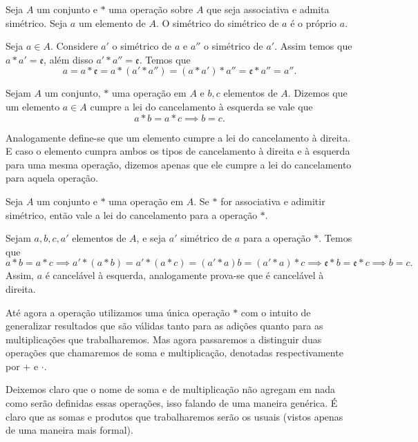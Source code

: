 \documentclass[../main.tex]{subfiles}
\begin{document}
\begin{prop}\label{agb-prop-simetricoSimetrico}
    Seja $A$ um conjunto e $*$ uma operação sobre $A$ que seja associativa e admita simétrico. Seja $a$ um elemento de $A$. O simétrico do simétrico de $a$ é o próprio $a$. 
\end{prop}
\begin{dem}
    Seja $a \in A$. Considere $a'$ o simétrico de $a$ e $a''$ o simétrico de $a'$. Assim temos que $a * a' = \mathfrak{e}$, além disso $a' * a'' = \mathfrak{e}$.
    Temos que 
    \[ a = a * \mathfrak{e} = a * (a' * a'') = (a * a') * a'' = \mathfrak{e} * a'' = a''. \]
\end{dem}
\begin{defi}
    Sejam $A$ um conjunto, $*$ uma operação em $A$ e $b,c$ elementos de $A$. Dizemos que um elemento $a \in A$ cumpre a lei do cancelamento à esquerda se vale que \[ a*b=a*c \implies b=c. \]
\end{defi}
    Analogamente define-se que um elemento cumpre a lei do cancelamento à direita. E caso o elemento cumpra ambos os tipos de cancelamento à direita e à esquerda para uma mesma operação, dizemos apenas que ele cumpre a lei do cancelamento para aquela operação.
\begin{prop}\label{agb-prop-leiCancelamento}
    Seja $A$ um conjunto e $*$ uma operação em $A$. Se $*$ for associativa e adimitir simétrico, então vale a lei do cancelamento para a operação $*$.
\end{prop}
\begin{dem}
    Sejam $a,b,c,a'$ elementos de $A$, e seja $a'$ simétrico de $a$ para a operação $*$. Temos que 
    \[a*b = a*c \implies a' * (a * b) = a' *(a*c) = (a' * a ) b = (a'*a)*c \implies \mathfrak{e} * b = \mathfrak{e} * c \implies b = c. \] 
    Assim, $a$ é cancelável à esquerda, analogamente prova-se que é cancelável à direita.
\end{dem}

Até agora a operação utilizamos uma única operação $*$ com o intuito de generalizar resultados que são válidas tanto para as adições quanto para as multiplicações que trabalharemos. Mas agora passaremos a distinguir duas operações que chamaremos de soma e multiplicação, denotadas respectivamente por $+$ e $\cdot$.

Deixemos claro que o nome de soma e de multiplicação não agregam em nada como serão definidas essas operações, isso falando de uma maneira genérica. É claro que as somas e produtos que trabalharemos serão os usuais (vistos apenas de uma maneira mais formal).
\end{document}
